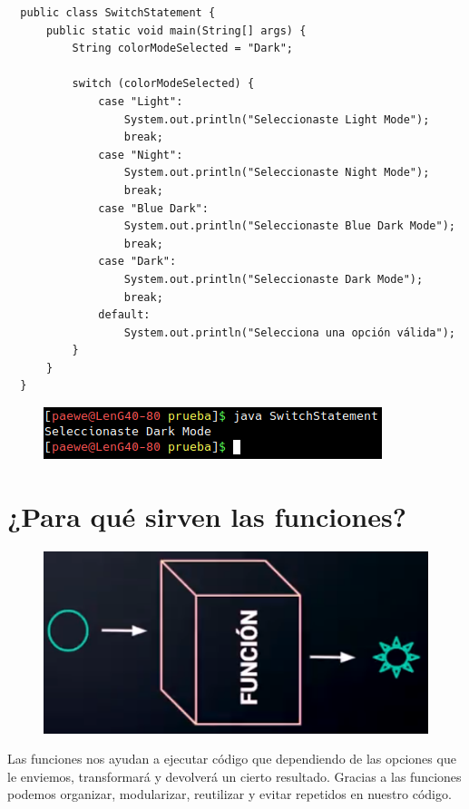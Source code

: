 \documentclass{article}
\begin{document}
\begin{verbatim}
  public class SwitchStatement {
      public static void main(String[] args) {
          String colorModeSelected = "Dark";

          switch (colorModeSelected) {
              case "Light":
                  System.out.println("Seleccionaste Light Mode");
                  break;
              case "Night":
                  System.out.println("Seleccionaste Night Mode");
                  break;
              case "Blue Dark":
                  System.out.println("Seleccionaste Blue Dark Mode");
                  break;
              case "Dark":
                  System.out.println("Seleccionaste Dark Mode");
                  break;
              default:
                  System.out.println("Selecciona una opción válida");
          }
      }
  }
\end{verbatim}

\begin{figure}[h!]
  \centering
  \includegraphics[scale=0.75]{./Pictures/048_switch.png}
\end{figure}


\section{¿Para qué sirven las funciones?}%

\begin{figure}[h!]
  \centering
  \includegraphics[scale=0.75]{./Pictures/024_funcion.png}
\end{figure}

Las funciones nos ayudan a ejecutar código que dependiendo de las opciones que
le enviemos, transformará y devolverá un cierto resultado. Gracias a las
funciones podemos organizar, modularizar, reutilizar y evitar repetidos en
nuestro código.\\
\end{document}
